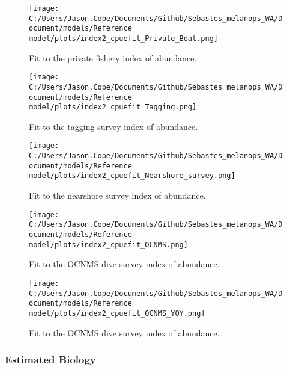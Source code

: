 \documentclass[11pt,
  english,
  letterpaper,
]{article}
\begin{document}
\pagebreak

\begin{figure}
\centering
\texttt{[image: C:/Users/Jason.Cope/Documents/Github/Sebastes\_melanops\_WA/Document/models/Reference model/plots/index2\_cpuefit\_Private\_Boat.png]}
\caption{Fit to the private fishery index of abundance.\label{fig:private-index-fit}}
\end{figure}

\pagebreak

\begin{figure}
\centering
\texttt{[image: C:/Users/Jason.Cope/Documents/Github/Sebastes\_melanops\_WA/Document/models/Reference model/plots/index2\_cpuefit\_Tagging.png]}
\caption{Fit to the tagging survey index of abundance.\label{fig:tag-index-fit}}
\end{figure}

\pagebreak

\begin{figure}
\centering
\texttt{[image: C:/Users/Jason.Cope/Documents/Github/Sebastes\_melanops\_WA/Document/models/Reference model/plots/index2\_cpuefit\_Nearshore\_survey.png]}
\caption{Fit to the nearshore survey index of abundance.\label{fig:nearshore-index-fit}}
\end{figure}

\pagebreak

\begin{figure}
\centering
\texttt{[image: C:/Users/Jason.Cope/Documents/Github/Sebastes\_melanops\_WA/Document/models/Reference model/plots/index2\_cpuefit\_OCNMS.png]}
\caption{Fit to the OCNMS dive survey index of abundance.\label{fig:ocnms-index-fit}}
\end{figure}

\pagebreak

\begin{figure}
\centering
\texttt{[image: C:/Users/Jason.Cope/Documents/Github/Sebastes\_melanops\_WA/Document/models/Reference model/plots/index2\_cpuefit\_OCNMS\_YOY.png]}
\caption{Fit to the OCNMS dive survey index of abundance.\label{fig:ocnms-yoy-index-fit}}
\end{figure}

\pagebreak

\hypertarget{estimated-biology}{%
\subsubsection{Estimated Biology}\label{estimated-biology}}
\end{document}
